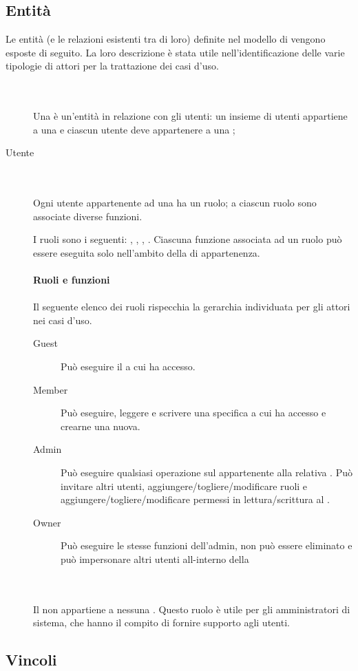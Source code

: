 \subsection{Entit\`a}
Le entit\`a (e le relazioni esistenti tra di loro) definite nel modello  di  vengono esposte di seguito. La loro descrizione \`e stata utile nell'identificazione delle varie tipologie di attori per la trattazione dei casi d'uso.
\begin{description}
	\item[] \hfill \\\\
	Una  \`e un'entit\`a in relazione con gli utenti: un insieme di utenti appartiene a una  e ciascun utente deve appartenere a una ;
	\item[Utente] \hfill \\\\
	Ogni utente appartenente ad una  ha un ruolo; a ciascun ruolo sono associate diverse funzioni.	
	
	I ruoli sono i seguenti: , , , .	
	Ciascuna funzione associata ad un ruolo pu\`o essere eseguita solo nell'ambito della  di appartenenza. \\\\
	\textbf{Ruoli e funzioni} \hfill \\\\
		Il seguente elenco dei ruoli rispecchia la gerarchia individuata per gli attori nei casi d'uso.
		\begin{description}
			\item[Guest] Pu\`o eseguire il  a cui ha accesso.
			\item[Member] Pu\`o eseguire, leggere e scrivere una specifica  a cui ha accesso e crearne una nuova.
			\item[Admin] Pu\`o eseguire qualsiasi operazione sul  appartenente alla relativa . Pu\`o invitare altri utenti, aggiungere/togliere/modificare ruoli e aggiungere/togliere/modificare permessi in lettura/scrittura al .
			\item[Owner] Pu\`o eseguire le stesse funzioni dell'admin, non pu\`o essere eliminato e pu\`o impersonare altri utenti all-interno della 
		\end{description}
	\item[] \hfill \\\\
	Il  non appartiene a nessuna . Questo ruolo \`e utile per gli amministratori di sistema, che hanno il compito di fornire supporto agli utenti.
\end{description}
\subsection{Vincoli}

